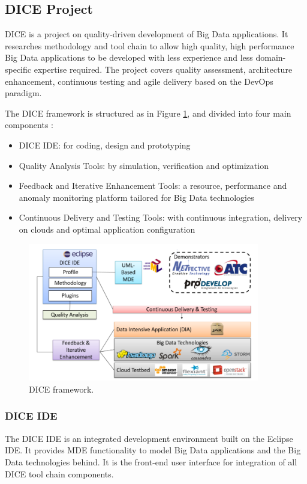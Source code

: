 \subsection{DICE Project}
DICE is a project on quality-driven development of Big Data applications.\cite{dice} It researches methodology and tool chain to allow high quality, high performance Big Data applications to be developed with less experience and less domain-specific expertise required. The project covers quality assessment, architecture enhancement, continuous testing and agile delivery based on the DevOps paradigm. 

The DICE framework is structured as in Figure \ref{fig:dice}, and divided into four main components \cite{dicetools}:
\begin{itemize}
\item DICE IDE: for coding, design and prototyping
\item Quality Analysis Tools: by simulation, verification and optimization
\item Feedback and Iterative Enhancement Tools: a resource, performance and anomaly monitoring platform tailored for Big Data technologies
\item Continuous Delivery and Testing Tools: with continuous integration, delivery on clouds and optimal application configuration
\end{itemize}
\begin{figure}[h]
\centering
\caption{DICE framework. \cite{dicetools}}
\label{fig:dice}
\includegraphics[width=0.9\textwidth]{images/dice.png}
\end{figure}

\newpage
\subsubsection{DICE IDE}
The DICE IDE is an integrated development environment built on the Eclipse IDE. It provides MDE functionality to model Big Data applications and the Big Data technologies behind. It is the front-end user interface for integration of all DICE tool chain components.
